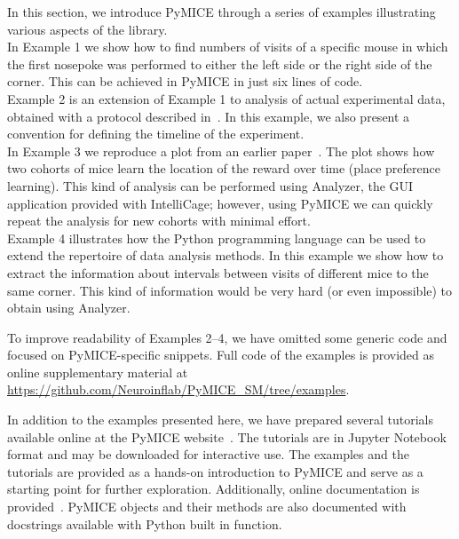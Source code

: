 In this section, we introduce PyMICE through a series of examples illustrating various aspects of the library.\\
In Example 1 we show how to find numbers of visits of a specific mouse in which the first nosepoke was performed to either
the left side or the right side of the corner.
This can be achieved in PyMICE in just six lines of code. \\
Example 2 is an extension of Example 1 to analysis
of actual experimental data, obtained with a protocol described in~\cite{Knapska:2013dj}.
In this example, we also present a convention for
defining the timeline of the experiment.
\\
In Example 3 we reproduce a plot from an earlier paper~\cite{Puscian:2014cu}.
The plot shows how two cohorts of mice learn the location
of the reward over time (place preference learning). This kind of analysis
can be performed using Analyzer, the GUI application provided
with IntelliCage; however, using PyMICE we can quickly repeat the analysis for
new cohorts with minimal effort. \\
Example 4 illustrates how the Python programming language can be used
to extend the repertoire of data analysis methods.
In this example we show how to extract the information about intervals between visits of different mice to the same corner.
This kind of information would be very hard (or even impossible) to obtain using Analyzer.

To improve readability of Examples 2--4, we have omitted some generic code
and focused on PyMICE-specific snippets. Full code of the examples
is provided as online supplementary material at \url{https://github.com/Neuroinflab/PyMICE_SM/tree/examples}.



In addition to the examples presented here, we have prepared several
tutorials available online at the PyMICE website~\cite{pymiceWebsite}.
The tutorials are in Jupyter Notebook~\cite{jupyterOrg} format and may be downloaded
for interactive use.
The examples and the tutorials are provided as a hands-on introduction to
PyMICE and serve as a starting point for further exploration.
Additionally, online documentation is provided~\cite{pymiceDoc}. PyMICE
objects and their methods are also documented with docstrings available with
Python built in  function.


